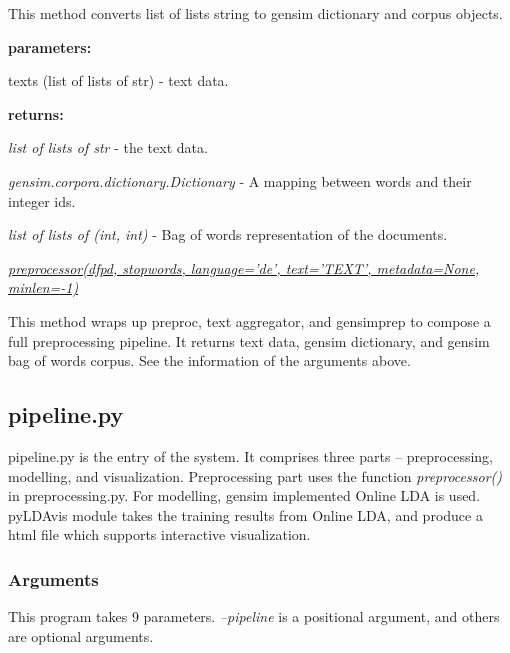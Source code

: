 \documentclass{article} %
\begin{document}
This method converts list of lists string to gensim dictionary and corpus objects.

\textbf{parameters: }
\begin{compactitem}
      \item texts (list of lists of str) - text data.
\end{compactitem}

\textbf{returns:}
\begin{compactitem}
      \item \textit{list of lists of str} - the text data.
      \item \textit{gensim.corpora.dictionary.Dictionary} - A mapping between words and their integer ids.
      \item \textit{list of lists of (int, int)} - Bag of words representation of the documents.
\end{compactitem}

\underline{\textit{preprocessor(df\textunderscore{}pd, stopwords, language='de', text='TEXT', metadata=None, min\textunderscore{}len=-1)}}

This method wraps up preproc, text aggregator, and gensim\textunderscore{}prep to compose a full preprocessing pipeline. It returns text data, gensim dictionary, and gensim bag of words corpus. See the information of the arguments above.

\subsection{pipeline.py}
pipeline.py is the entry of the system. It comprises three parts -- preprocessing, modelling, and visualization. Preprocessing part uses the function \textit{preprocessor()} in preprocessing.py. For modelling, gensim implemented Online LDA is used. pyLDAvis module takes the training results from Online LDA, and produce a html file which supports interactive visualization.

\subsubsection{Arguments}
This program takes 9 parameters. \textit{--pipeline} is a positional argument, and others are optional arguments.
\end{document}
